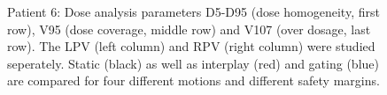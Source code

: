 \documentclass[type=dr, dr=rernat, accentcolor=tud7b,colorbacktitle, bigchapter, openright, twoside, 12pt ]{tudthesis}
\begin{document}
\begin{figure}[H]
{ }
\caption{Patient 6: Dose analysis parameters D5-D95 (dose homogeneity, first row), V95 (dose coverage, middle row) and V107 (over dosage, last row). 
The LPV (left column) and RPV (right column) were studied seperately. Static (black) as well as interplay (red) and gating (blue) 
are compared for four different motions and different safety margins.}
\label{static_interplay_gating_Pat06}
\end{figure}

\newpage

\begin{figure}[H]
 \subfigure[V95: LPV]{
}
\end{figure}
\end{document}
